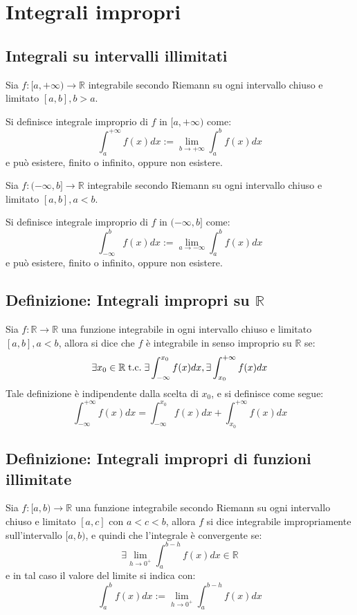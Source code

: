 \documentclass[a4paper,12pt,openright]{book}
\begin{document}
	\chapter{Integrali impropri}
	\section{Integrali su intervalli illimitati}
	Sia $f: [a, +\infty) \longrightarrow \mathbb{R}$ integrabile secondo Riemann su ogni intervallo chiuso e limitato $[a, b], b > a$.
	
	Si definisce integrale improprio di $f$ in $[a, +\infty)$ come:
	\[\int_{a}^{+\infty} f(x)dx := \lim_{b \to +\infty} \int_{a}^{b} f(x)dx\]
	e può esistere, finito o infinito, oppure non esistere.
	\newline
	
	Sia $f: (-\infty, b] \longrightarrow \mathbb{R}$ integrabile secondo Riemann su ogni intervallo chiuso e limitato $[a, b], a < b$.
	
	Si definisce integrale improprio di $f$ in $(-\infty, b]$ come:
	\[\int_{-\infty}^{b} f(x)dx := \lim_{a \to -\infty} \int_{a}^{b} f(x)dx\]
	e può esistere, finito o infinito, oppure non esistere.
		
	\section{Definizione: Integrali impropri su $\mathbb{R}$}
	Sia $f: \mathbb{R} \longrightarrow \mathbb{R}$ una funzione integrabile in ogni intervallo chiuso e limitato $[a, b], a < b$, allora si dice che $f$ è integrabile in senso improprio su $\mathbb{R}$ se:
	\[\exists x_0 \in \mathbb{R} \;\text{t.c.}\; \exists \int_{-\infty}^{x_0} f(x)dx, \exists \int_{x_0}^{+\infty} f(x)dx\]
	Tale definizione è indipendente dalla scelta di $x_0$, e si definisce come segue:
	\[\int_{-\infty}^{+\infty} f(x)dx = \int_{-\infty}^{x_0} f(x)dx + \int_{x_0}^{+\infty} f(x)dx\]
	
	\newpage
	
	\section{Definizione: Integrali impropri di funzioni illimitate}
	Sia $f : [a,b) \longrightarrow \mathbb{R}$ una funzione integrabile secondo Riemann su ogni intervallo chiuso e limitato $[a,c]$ con $a < c < b$, allora $f$ si dice integrabile impropriamente sull'intervallo $[a, b)$, e quindi che l'integrale è convergente se:
	\[\exists \lim_{h \to 0^+} \int_{a}^{b - h} f(x)dx \in \mathbb{R}\]
	e in tal caso il valore del limite si indica con:
	\[\int_{a}^{b} f(x)dx := \lim_{h \to 0^+} \int_{a}^{b - h} f(x)dx\]
	
\end{document}
